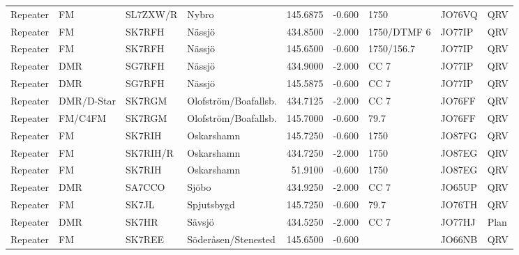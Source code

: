 \begin{landscape}
\begin{longtable}{llllrrlll}
	Repeater          & FM              & SL7ZXW/R & Nybro                &     145.6875 &     -0.600 & 1750              & JO76VQ      & QRV      \\
	Repeater          & FM              & SK7RFH   & Nässjö               &     434.8500 &     -2.000 & 1750/DTMF 6       & JO77IP      & QRV      \\
	Repeater          & FM              & SK7RFH   & Nässjö               &     145.6500 &     -0.600 & 1750/156.7        & JO77IP      & QRV      \\
	Repeater          & DMR             & SG7RFH   & Nässjö               &     434.9000 &     -2.000 & CC 7              & JO77IP      & QRV      \\
	Repeater          & DMR             & SG7RFH   & Nässjö               &     145.5875 &     -0.600 & CC 7              & JO77IP      & QRV      \\
	Repeater          & DMR/D-Star      & SK7RGM   & Olofström/Boafallsb. &     434.7125 &     -2.000 & CC 7              & JO76FF      & QRV      \\
	Repeater          & FM/C4FM         & SK7RGM   & Olofström/Boafallsb. &     145.7000 &     -0.600 & 79.7              & JO76FF      & QRV      \\
	Repeater          & FM              & SK7RIH   & Oskarshamn           &     145.7250 &     -0.600 & 1750              & JO87FG      & QRV      \\
	Repeater          & FM              & SK7RIH/R & Oskarshamn           &     434.7250 &     -2.000 & 1750              & JO87EG      & QRV      \\
	Repeater          & FM              & SK7RIH   & Oskarshamn           &      51.9100 &     -0.600 & 1750              & JO87EG      & QRV      \\
	Repeater          & DMR             & SA7CCO   & Sjöbo                &     434.9250 &     -2.000 & CC 7              & JO65UP      & QRV      \\
	Repeater          & FM              & SK7JL    & Spjutsbygd           &     145.7250 &     -0.600 & 79.7              & JO76TH      & QRV      \\
	Repeater          & DMR             & SK7HR    & Sävsjö               &     434.5250 &     -2.000 & CC 7              & JO77HJ      & Plan     \\
	Repeater          & FM              & SK7REE   & Söderåsen/Stenested  &     145.6500 &     -0.600 &                   & JO66NB      & QRV      \\

\end{longtable}
\end{landscape}
